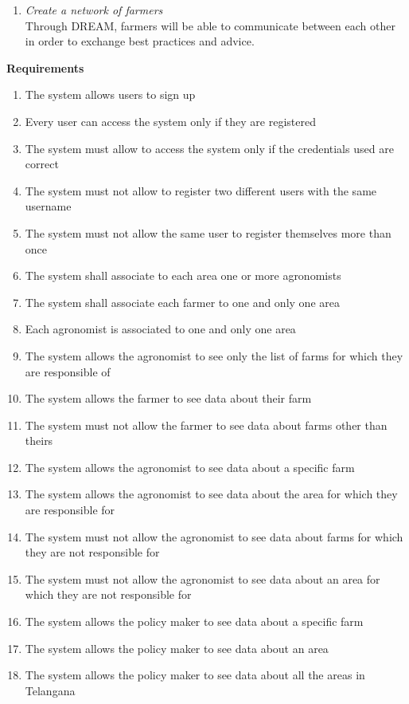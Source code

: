 \documentclass[10pt]{report}
\begin{document}
\begin{enumerate} [label=(G\arabic*), font=\itshape]
    \item \emph{Create a network of farmers} \\Through DREAM, farmers will be able to communicate between each other in order to exchange best practices and advice.
\end{enumerate}

\textbf{Requirements}
\begin{enumerate} [label=(R\arabic*), font=\itshape]
    \item The system allows users to sign up
    \item Every user can access the system only if they are registered
    \item The system must allow to access the system only if the credentials used are correct
    \item The system must not allow to register two different users with the same username
    \item The system must not allow the same user to register themselves more than once
    \item The system shall associate to each area one or more agronomists
    \item The system shall associate each farmer to one and only one area
    \item Each agronomist is associated to one and only one area
    \item The system allows the agronomist to see only the list of farms for which they are responsible of
    \item The system allows the farmer to see data about their farm
    \item The system must not allow the farmer to see data about farms other than theirs
    \item The system allows the agronomist to see data about a specific farm
    \item The system allows the agronomist to see data about the area for which they are responsible for
    \item The system must not allow the agronomist to see data about farms for which they are not responsible for 
    \item The system must not allow the agronomist to see data about an area for which they are not responsible for
    \item The system allows the policy maker to see data about a specific farm
    \item The system allows the policy maker to see data about an area
    \item The system allows the policy maker to see data about all the areas in Telangana

\end{enumerate}
\end{document}
